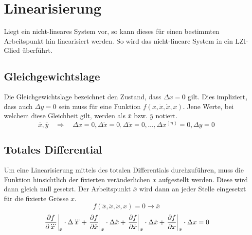 \section{Linearisierung}
Liegt ein nicht-lineares System vor, so kann dieses für einen
bestimmten Arbeitspunkt hin linearisiert werden. So wird das
nicht-lineare System in ein LZI-Glied überführt.

\subsection{Gleichgewichtslage}
Die Gleichgewichtslage bezeichnet den Zustand, dass $\Delta x = 0$ gilt.
Dies impliziert, dass auch $\Delta y = 0$ sein muss für eine Funktion
$f(\dddot{x}, \ddot{x}, \dot{x}, x)$. Jene Werte, bei welchem diese 
Gleichheit gilt, werden als $\bar{x}$ bzw. $\bar{y}$ notiert.
\[  
    \bar{x}, \bar{y}
        \quad \Rightarrow \quad
        \Delta x = 0, 
        \Delta \dot{x} = 0,
        \Delta \ddot{x} = 0,    
        \dots,
        \Delta x^{(n)} = 0,
        \Delta y = 0
\]

\subsection{Totales Differential}
Um eine Linearisierung mittels des totalen Differentials durchzuführen,
muss die Funktion hinsichtlich der fixierten veränderlichen $x$ 
aufgestellt werden. Diese wird dann gleich null gesetzt. 
Der Arbeitspunkt $\bar{x}$ wird dann an jeder Stelle eingesetzt für die 
fixierte Grösse $x$. 
\[ 
    f(\dddot{x}, \ddot{x}, \dot{x}, x) = 0 \rightarrow \bar{x}
\]
\[ 
    \begin{array}{r l} 
		\displaystyle 
            \left. \frac{\partial f}{\partial \dddot{x}}
                \right\rvert_{\bar{x}} \cdot \Delta \dddot{x}
            + \left.\frac{\partial f}{\partial \ddot{x}}
                \right\rvert_{\bar{x}} \cdot \Delta \ddot{x}
            + \left.\frac{\partial f}{\partial \dot{x}}
                \right\rvert_{\bar{x}} \cdot \Delta \dot{x}
            + \left.\frac{\partial f}{\partial x}
                \right\rvert_{\bar{x}} \cdot \Delta x 
            = 0\\
    \end{array} 
\]


